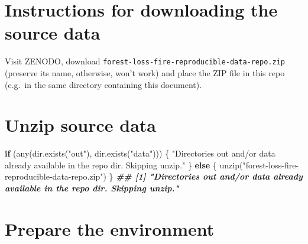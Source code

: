 \documentclass[10pt,landscape,a3paper]{article}
\newenvironment{Shaded}{\begin{snugshade}}{\end{snugshade}}
\newcommand{\ControlFlowTok}[1]{\textcolor[rgb]{0.13,0.29,0.53}{\textbf{#1}}}
\newcommand{\DocumentationTok}[1]{\textcolor[rgb]{0.56,0.35,0.01}{\textbf{\textit{#1}}}}
\newcommand{\FunctionTok}[1]{\textcolor[rgb]{0.00,0.00,0.00}{#1}}
\newcommand{\NormalTok}[1]{#1}
\newcommand{\StringTok}[1]{\textcolor[rgb]{0.31,0.60,0.02}{#1}}
\begin{document}
\hypertarget{instructions-for-downloading-the-source-data}{%
\section{Instructions for downloading the source
data}\label{instructions-for-downloading-the-source-data}}

Visit ZENODO, download
\texttt{forest-loss-fire-reproducible-data-repo.zip} (preserve its name,
otherwise, won't work) and place the ZIP file in this repo (e.g.~in the
same directory containing this document).

\hypertarget{unzip-source-data}{%
\section{Unzip source data}\label{unzip-source-data}}

\begin{Shaded}
\begin{Highlighting}[]
\ControlFlowTok{if}\NormalTok{ (}\FunctionTok{any}\NormalTok{(}\FunctionTok{dir.exists}\NormalTok{(}\StringTok{"out"}\NormalTok{), }\FunctionTok{dir.exists}\NormalTok{(}\StringTok{"data"}\NormalTok{))) \{}
    \StringTok{"Directories \textquotesingle{}out\textquotesingle{} and/or \textquotesingle{}data\textquotesingle{} already available in the repo dir. Skipping unzip."}
\NormalTok{\} }\ControlFlowTok{else}\NormalTok{ \{}
    \FunctionTok{unzip}\NormalTok{(}\StringTok{"forest{-}loss{-}fire{-}reproducible{-}data{-}repo.zip"}\NormalTok{)}
\NormalTok{\}}
\DocumentationTok{\#\# [1] "Directories \textquotesingle{}out\textquotesingle{} and/or \textquotesingle{}data\textquotesingle{} already available in the repo dir. Skipping unzip."}
\end{Highlighting}
\end{Shaded}

\hypertarget{prepare-the-environment}{%
\section{Prepare the environment}\label{prepare-the-environment}}
\end{document}
